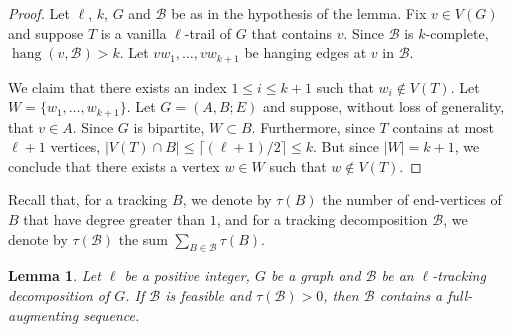 \documentclass[12pt,reqno,a4paper]{amsart}
\newtheorem{lemma}[theorem]{Lemma}
\DeclareMathOperator{\hang}{hang}
\newcommand{\B}{\mathcal{B}}
\newcommand{\full}{full}
\begin{document}
\begin{proof}
  Let $\ell$, \(k\), $G$ and $\B$ be as in the hypothesis
  of the lemma. 
   Fix $v\in V(G)$ and suppose \(T\)
  is a vanilla $\ell$-trail of $G$ that contains \(v\).
  Since \(\B\)
  is \(k\)-complete,
  $\hang(v,\B)> k$.  Let
  \(vw_1,\ldots,vw_{k+1}\)
  be hanging edges at $v$ in $\B$.
	
	
	We claim that there exists an index \(1\leq i\leq k+1\) 
	such that \(w_i \notin V(T)\). 	Let \(W = \{w_1,\ldots,w_{k+1}\}\).
	Let $G=(A,B;E)$ and suppose, without loss of generality, that \(v\in A\).
	Since \(G\) is bipartite, \(W\subset B\). Furthermore, since \(T\) 
contains at most \(\ell + 1\) 
	vertices, \(|V(T)\cap B| \leq  \lceil (\ell+1)/2\rceil \leq k\). But since 
$|W|=k+1$, we 
	conclude that there exists a vertex $w\in W$ such that \(w\notin V(T)\).
\end{proof}


%
Recall that, for a tracking \(B\), 
we denote by \(\tau(B)\) the number of end-vertices 
of \(B\) that have degree greater than $1$,
and for a tracking decomposition \(\B\), 
we denote by \(\tau(\B)\) the sum \(\sum_{B\in \mathcal{B}}\tau(B)\).
 

\begin{lemma}\label{lemma:existence-of-sequence}
	Let \(\ell\) be a positive integer, \(G\) be a graph and 
	 \(\B\) be an \(\ell\)-tracking decomposition of $G$. If $\B$ is
         feasible and \(\tau(\B) > 0\),
	then \(\B\) contains a \full-augmenting sequence.
\end{lemma}
\end{document}

